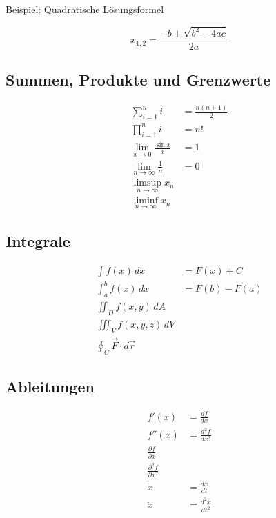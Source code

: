 \documentclass[11pt,a4paper]{scrartcl}
\begin{document}
	Beispiel: Quadratische Lösungsformel
	
	\begin{equation}
		\boxed{
			x_{1,2} =
			\frac{-b \pm \sqrt{b^2-4ac}}{2a}
		}
	\end{equation}
	
	\subsection{Summen, Produkte und Grenzwerte}
	
	\begin{align}
		\sum_{i=1}^{n} i
		&= \frac{n(n+1)}{2} \\[6pt]
		\prod_{i=1}^{n} i
		&= n! \\[6pt]
		\lim_{x\to 0}\frac{\sin x}{x}
		&= 1 \\[6pt]
		\lim_{n\to\infty}\frac{1}{n}
		&= 0 \\[6pt]
		\limsup_{n\to\infty}x_n
		& \\[6pt]
		\liminf_{n\to\infty}x_n
		&
	\end{align}
	
	\subsection{Integrale}
	
	\begin{align}
		\int f(x)\,dx
		&= F(x)+C \\[6pt]
		\int_a^b f(x)\,dx
		&= F(b)-F(a) \\[6pt]
		\iint_D f(x,y)\,dA
		& \\[6pt]
		\iiint_V f(x,y,z)\,dV
		& \\[6pt]
		\oint_C \vec{F}\cdot d\vec{r}
		&
	\end{align}
	
	\subsection{Ableitungen}
	
	\begin{align}
		f'(x)
		&= \frac{df}{dx} \\[6pt]
		f''(x)
		&= \frac{d^2f}{dx^2} \\[6pt]
		\frac{\partial f}{\partial x}
		& \\[6pt]
		\frac{\partial^2 f}{\partial x^2}
		& \\[6pt]
		\dot{x}
		&= \frac{dx}{dt} \\[6pt]
		\ddot{x}
		&= \frac{d^2x}{dt^2}
	\end{align}
	
\end{document}
